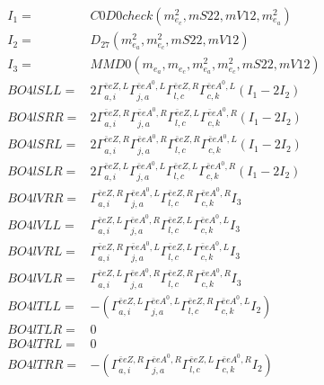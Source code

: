 \documentclass[A4,landscape]{article}
\begin{document}
\begin{align} 
I_1 = & C0D0check(m^2_{e_{{c}}}, mS22, mV12, m^2_{e_{{a}}}) \\ 
I_2 = & D_{27}(m^2_{e_{{a}}}, m^2_{e_{{c}}}, mS22, mV12) \\ 
I_3 = & MMD0(m_{e_{{a}}}, m_{e_{{c}}}, m^2_{e_{{a}}}, m^2_{e_{{c}}}, mS22, mV12) \\ 
  BO4lSLL= & 2  \Gamma^{\bar{e}e Z ,L}_{a, i} \Gamma^{\bar{e}e A^0 ,L}_{j, a} \Gamma^{\bar{e}e Z ,R}_{l, c} \Gamma^{\bar{e}e A^0 ,L}_{c, k} (I_1 - 2 I_2) \\ 
  BO4lSRR= & 2  \Gamma^{\bar{e}e Z ,R}_{a, i} \Gamma^{\bar{e}e A^0 ,R}_{j, a} \Gamma^{\bar{e}e Z ,L}_{l, c} \Gamma^{\bar{e}e A^0 ,R}_{c, k} (I_1 - 2 I_2) \\ 
  BO4lSRL= & 2  \Gamma^{\bar{e}e Z ,R}_{a, i} \Gamma^{\bar{e}e A^0 ,R}_{j, a} \Gamma^{\bar{e}e Z ,R}_{l, c} \Gamma^{\bar{e}e A^0 ,L}_{c, k} (I_1 - 2 I_2) \\ 
  BO4lSLR= & 2  \Gamma^{\bar{e}e Z ,L}_{a, i} \Gamma^{\bar{e}e A^0 ,L}_{j, a} \Gamma^{\bar{e}e Z ,L}_{l, c} \Gamma^{\bar{e}e A^0 ,R}_{c, k} (I_1 - 2 I_2) \\ 
  BO4lVRR= &  \Gamma^{\bar{e}e Z ,R}_{a, i} \Gamma^{\bar{e}e A^0 ,L}_{j, a} \Gamma^{\bar{e}e Z ,R}_{l, c} \Gamma^{\bar{e}e A^0 ,R}_{c, k} I_3 \\ 
  BO4lVLL= &  \Gamma^{\bar{e}e Z ,L}_{a, i} \Gamma^{\bar{e}e A^0 ,R}_{j, a} \Gamma^{\bar{e}e Z ,L}_{l, c} \Gamma^{\bar{e}e A^0 ,L}_{c, k} I_3 \\ 
  BO4lVRL= &  \Gamma^{\bar{e}e Z ,R}_{a, i} \Gamma^{\bar{e}e A^0 ,L}_{j, a} \Gamma^{\bar{e}e Z ,L}_{l, c} \Gamma^{\bar{e}e A^0 ,L}_{c, k} I_3 \\ 
  BO4lVLR= &  \Gamma^{\bar{e}e Z ,L}_{a, i} \Gamma^{\bar{e}e A^0 ,R}_{j, a} \Gamma^{\bar{e}e Z ,R}_{l, c} \Gamma^{\bar{e}e A^0 ,R}_{c, k} I_3 \\ 
  BO4lTLL= & -( \Gamma^{\bar{e}e Z ,L}_{a, i} \Gamma^{\bar{e}e A^0 ,L}_{j, a} \Gamma^{\bar{e}e Z ,R}_{l, c} \Gamma^{\bar{e}e A^0 ,L}_{c, k} I_2) \\ 
  BO4lTLR= & 0 \\ 
  BO4lTRL= & 0 \\ 
  BO4lTRR= & -( \Gamma^{\bar{e}e Z ,R}_{a, i} \Gamma^{\bar{e}e A^0 ,R}_{j, a} \Gamma^{\bar{e}e Z ,L}_{l, c} \Gamma^{\bar{e}e A^0 ,R}_{c, k} I_2) \\ 
\end{align} 
\end{document}
